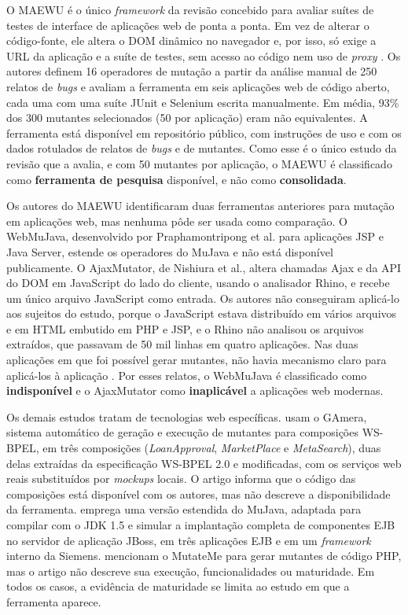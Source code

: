O MAEWU é o único \textit{framework} da revisão concebido para avaliar suítes de testes de interface de aplicações web de ponta a ponta. Em vez de alterar o código-fonte, ele altera o DOM dinâmico no navegador e, por isso, só exige a URL da aplicação e a suíte de testes, sem acesso ao código nem uso de \textit{proxy} \cite{yandrapally2021}. Os autores definem 16 operadores de mutação a partir da análise manual de 250 relatos de \textit{bugs} e avaliam a ferramenta em seis aplicações web de código aberto, cada uma com uma suíte JUnit e Selenium escrita manualmente. Em média, 93\% dos 300 mutantes selecionados (50 por aplicação) eram não equivalentes. A ferramenta está disponível em repositório público, com instruções de uso e com os dados rotulados de relatos de \textit{bugs} e de mutantes. Como esse é o único estudo da revisão que a avalia, e com 50 mutantes por aplicação, o MAEWU é classificado como \textbf{ferramenta de pesquisa} disponível, e não como \textbf{consolidada}.

Os autores do MAEWU identificaram duas ferramentas anteriores para mutação em aplicações web, mas nenhuma pôde ser usada como comparação. O WebMuJava, desenvolvido por Praphamontripong et al. para aplicações JSP e Java Server, estende os operadores do MuJava e não está disponível publicamente. O AjaxMutator, de Nishiura et al., altera chamadas Ajax e da API do DOM em JavaScript do lado do cliente, usando o analisador Rhino, e recebe um único arquivo JavaScript como entrada. Os autores não conseguiram aplicá-lo aos sujeitos do estudo, porque o JavaScript estava distribuído em vários arquivos e em HTML embutido em PHP e JSP, e o Rhino não analisou os arquivos extraídos, que passavam de 50 mil linhas em quatro aplicações. Nas duas aplicações em que foi possível gerar mutantes, não havia mecanismo claro para aplicá-los à aplicação \cite{yandrapally2021}. Por esses relatos, o WebMuJava é classificado como \textbf{indisponível} e o AjaxMutator como \textbf{inaplicável} a aplicações web modernas.

Os demais estudos tratam de tecnologias web específicas.  usam o GAmera, sistema automático de geração e execução de mutantes para composições WS-BPEL, em três composições (\textit{LoanApproval}, \textit{MarketPlace} e \textit{MetaSearch}), duas delas extraídas da especificação WS-BPEL 2.0 e modificadas, com os serviços web reais substituídos por \textit{mockups} locais. O artigo informa que o código das composições está disponível com os autores, mas não descreve a disponibilidade da ferramenta.  emprega uma versão estendida do MuJava, adaptada para compilar com o JDK 1.5 e simular a implantação completa de componentes EJB no servidor de aplicação JBoss, em três aplicações EJB e em um \textit{framework} interno da Siemens.  mencionam o MutateMe para gerar mutantes de código PHP, mas o artigo não descreve sua execução, funcionalidades ou maturidade. Em todos os casos, a evidência de maturidade se limita ao estudo em que a ferramenta aparece.

